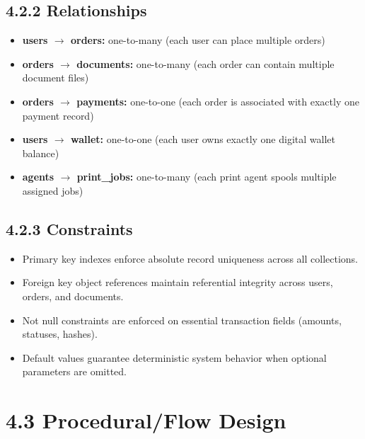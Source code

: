 \documentclass[12pt,a4paper]{report}
\begin{document}
\subsection{4.2.2 Relationships}
\begin{itemize}[leftmargin=0.35in, itemsep=2pt]
  \item \textbf{users $\rightarrow$ orders:} one-to-many (each user can place multiple orders)
  \item \textbf{orders $\rightarrow$ documents:} one-to-many (each order can contain multiple document files)
  \item \textbf{orders $\rightarrow$ payments:} one-to-one (each order is associated with exactly one payment record)
  \item \textbf{users $\rightarrow$ wallet:} one-to-one (each user owns exactly one digital wallet balance)
  \item \textbf{agents $\rightarrow$ print\_jobs:} one-to-many (each print agent spools multiple assigned jobs)
\end{itemize}

\subsection{4.2.3 Constraints}
\begin{itemize}[leftmargin=0.35in, itemsep=2pt]
  \item Primary key indexes enforce absolute record uniqueness across all collections.
  \item Foreign key object references maintain referential integrity across users, orders, and documents.
  \item Not null constraints are enforced on essential transaction fields (amounts, statuses, hashes).
  \item Default values guarantee deterministic system behavior when optional parameters are omitted.
\end{itemize}

\section{4.3 Procedural/Flow Design}
\end{document}
